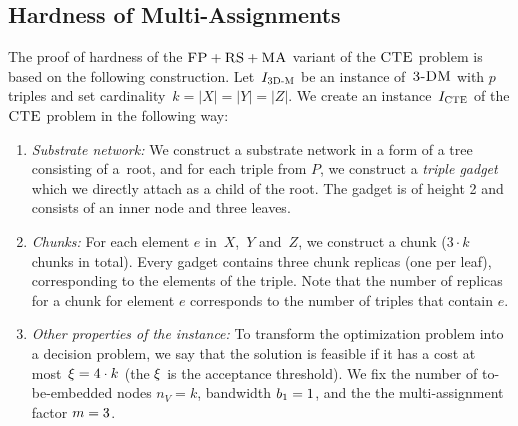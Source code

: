 \subsection{Hardness of Multi-Assignments}\label{ssec:fprsma}

The proof of hardness of the $\textsc{FP}+\textsc{RS}+\textsc{MA}$ variant of the $\textsc{CTE}$ problem is based on the following construction.
Let~$I_{\mathrm{\textsc{3D-M}}}$ be an instance of~$\textsc{3-DM}$ with $p$ triples and set cardinality~${k = |X| = |Y| = |Z|}$.
We create an instance~$I_{\mathrm{\textsc{CTE}}}$ of the $\textsc{CTE}$ problem in the following way:
\begin{enumerate}
\item \emph{Substrate network:} We construct a substrate network in a form of a tree consisting of a~root,
and for each triple from $P$, we construct a \emph{triple gadget} which we directly attach as
a child of the root. The gadget is of height 2
and consists of an inner node and three leaves.
\item \emph{Chunks:} For each element $e$ in~$X$,~$Y$ and~$Z$,
 we construct a chunk
($3 \cdot k$ chunks in total). Every gadget contains three chunk replicas (one per leaf),
corresponding to the elements of the triple.
Note that the number of replicas for a chunk for element $e$ corresponds to the number of triples that contain $e$.
\item \emph{Other properties of the instance:}
To transform the optimization problem into a decision problem, we say that the solution is feasible if it has a cost at most~$\xi = 4\cdot k$ (the $\xi$ is the acceptance threshold).
We fix the number of to-be-embedded nodes $n_V = k$, bandwidth
$b_1 = 1$, and the the multi-assignment factor
$m=3$.
\end{enumerate}

%


